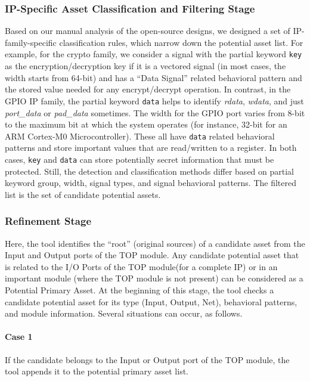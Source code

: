 \subsubsection{IP-Specific Asset Classification and Filtering Stage}
Based on our manual analysis of the open-source designs, we designed a set of IP-family-specific classification rules, which narrow down the potential asset list. For example, for the crypto family, we consider a signal with the partial keyword \texttt{key} as the encryption/decryption key if it is a vectored signal (in most cases, the width starts from 64-bit) and has a ``Data Signal'' related behavioral pattern and the stored value needed for any encrypt/decrypt operation. 
In contrast, in the GPIO IP family, the partial keyword \texttt{data} helps to identify \textit{rdata}, \textit{wdata}, and just \textit{port\_data} or \textit{pad\_data} sometimes. The width for the GPIO port varies from 8-bit to the maximum bit at which the system operates (for instance, 32-bit for an ARM Cortex-M0 Microcontroller).
These all have \texttt{data} related behavioral patterns and store important values that are read/written to a register. 
In both cases, \texttt{key} and \texttt{data} can store potentially secret information that must be protected. Still, the detection and classification methods differ based on partial keyword group, width, signal types, and signal behavioral patterns. 
The filtered list is the set of candidate potential assets. 

\subsubsection{Refinement Stage\label{sssec:RS}}
Here, the tool identifies the ``root'' (original sources) of a candidate asset from the Input and Output ports of the TOP module. Any candidate potential asset that is related to the I/O Ports of the TOP module(for a complete IP) or in an important module (where the TOP module is not present) can be considered as a Potential Primary Asset.
At the beginning of this stage, the tool checks a candidate potential asset for its type (Input, Output, Net), behavioral patterns, and module information. Several situations can occur, as follows. 

\paragraph*{Case 1} If the candidate belongs to the Input or Output port of the TOP module, the tool appends it to the potential primary asset list.

